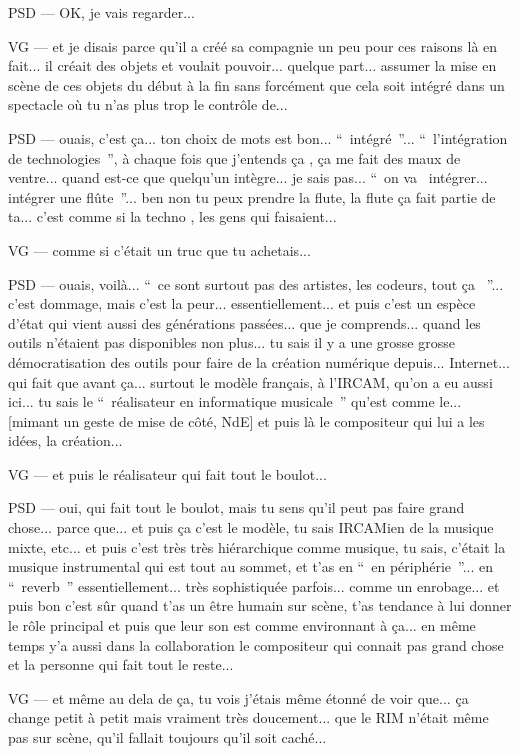 PSD — OK, je vais regarder...

VG — et je disais parce qu'il a créé sa compagnie un peu pour ces raisons là en fait... il créait des objets et voulait pouvoir... quelque part... assumer la mise en scène de ces objets du début à la fin sans forcément que cela soit intégré dans un spectacle où tu n'as plus trop le contrôle de...

PSD — ouais, c'est ça... ton choix de mots est bon... “ intégré ”... “ l'intégration de technologies ”,  à chaque fois que j'entends ça , ça me fait des maux de ventre... quand est-ce que quelqu'un intègre... je sais pas... “ on va  intégrer... intégrer une flûte ”... ben non tu peux prendre la flute, la flute ça fait partie de ta... c'est comme si la techno , les gens qui faisaient...

VG — comme si c'était un truc que tu achetais...

PSD — ouais, voilà... “ ce sont surtout pas des artistes, les codeurs, tout ça  ”... c'est dommage, mais c'est la peur... essentiellement... et puis c'est un espèce d'état qui vient aussi des générations passées... que je comprends... quand les outils n'étaient pas disponibles non plus... tu sais il y a une grosse grosse démocratisation des outils pour faire de la création numérique depuis... Internet... qui fait que avant ça... surtout le modèle français, à l'\gls{IRCAM}, qu'on a eu aussi ici... tu sais le “ réalisateur en informatique musicale ” qu'est comme le... [mimant un geste de mise de côté, NdE] et puis là le compositeur qui lui a les idées, la création...

VG — et puis le réalisateur qui fait tout le boulot...

PSD — oui, qui fait tout le boulot, mais tu sens qu'il peut pas faire grand chose... parce que... et puis ça c'est le modèle, tu sais IRCAMien de la musique mixte, etc... et puis c'est très très hiérarchique comme musique, tu sais, c'était la musique instrumental qui est tout au sommet, et t'as en “ en périphérie ”... en “ reverb ” essentiellement... très sophistiquée parfois... comme un enrobage... et puis bon c'est sûr quand t'as un être humain sur scène, t'as tendance à lui donner le rôle principal et puis que leur son est comme environnant à ça... en même temps y'a aussi dans la collaboration le compositeur qui connait pas grand chose et la personne qui fait tout le reste...

VG — et même au dela de ça, tu vois j'étais même étonné de voir que... ça change petit à petit mais vraiment très doucement... que le RIM n'était même pas sur scène, qu'il fallait toujours qu'il soit caché...

